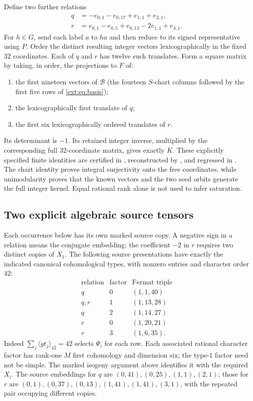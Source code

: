 Define two further relations
\begin{align*}
 q&=-e_{0,1}-e_{0,17}+e_{1,1}+e_{2,1},\\
 r&= e_{0,1}-e_{0,5}+e_{0,13}-2e_{1,1}+e_{3,1}.
\end{align*}
For $h\in G$, send each label $a$ to $ha$ and then reduce to its
signed representative using $P$. Order the distinct resulting integer
vectors lexicographically in the fixed $32$ coordinates. Each of
$q$ and $r$ has twelve such translates. Form a square matrix by taking,
in order, the projections to $F$ of:
\begin{enumerate}[label=(\roman*)]
\item the first nineteen vectors of $\mathcal B$ (the fourteen
$S$-chart columns followed by the first five rows of
\eqref{ext:eq:basis});
\item the lexicographically first translate of $q$;
\item the first six lexicographically ordered translates of $r$.
\end{enumerate}
Its determinant is $-1$. Its retained integer inverse, multiplied by
the corresponding full $32$-coordinate matrix, gives exactly $K$.
These explicitly specified finite identities are certified in
, reconstructed by
, and
regressed in .
The chart identity proves integral surjectivity onto the free
coordinates, while unimodularity proves that the known vectors and
the two seed orbits generate the full integer kernel. Equal rational
rank alone is not used to infer saturation.

\subsection{Two explicit algebraic source tensors}
\label{eight:sec:sources}
Each occurrence below has its own marked source copy. A negative sign
in a relation means the conjugate embedding; the coefficient $-2$ in
$r$ requires two distinct copies of $X_1$.
The following source presentations have exactly the indicated canonical
cohomological types, with nonzero entries and character order $42$:
\[
\begin{array}{c|c|c}
\text{relation}&\text{factor}&\text{Fermat triple}\\\hline
q&0&(1,1,40)\\
q,r&1&(1,13,28)\\
q&2&(1,14,27)\\
r&0&(1,20,21)\\
r&3&(1,6,35).
\end{array}
\]
Indeed $\sum_j\langle gt_j\rangle_{42}=42$ selects $\Psi_i$
for each row. Each associated rational character factor has rank-one
$M$ first cohomology and dimension six; the type-$1$ factor need not
be simple. The marked isogeny argument above identifies it with the
required $X_i$. The source embeddings for $q$ are
$(0,41),(0,25),(1,1),(2,1)$; those for $r$ are
$(0,1),(0,37),(0,13),(1,41),(1,41),(3,1)$, with the repeated
pair occupying different copies.


